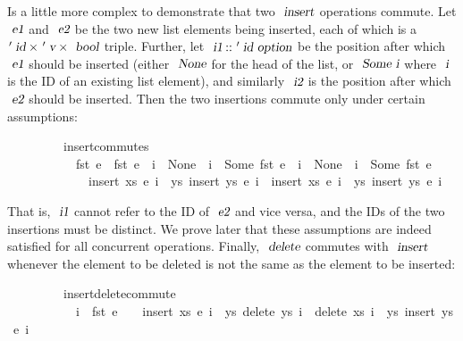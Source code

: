 Is a little more complex to demonstrate that two $\isa{insert}$ operations commute.
Let $\isa{e1}$ and $\isa{e2}$ be the two new list elements being inserted, each of which is a $\isacharprime\isa{id} \mathbin{\isasymtimes} \isacharprime\isa{v} \mathbin{\isasymtimes} \isa{bool}$ triple.
Further, let $\isa{i1} \mathbin{\isacharcolon\isacharcolon} \isacharprime\isa{id option}$ be the position after which $\isa{e1}$ should be inserted (either $\isa{None}$ for the head of the list, or $\isa{Some i}$ where $\isa{i}$ is the ID of an existing list element), and similarly $\isa{i2}$ is the position after which $\isa{e2}$ should be inserted.
Then the two insertions commute only under certain assumptions:
\vspace{0.35em}
\begin{isabellebody}
\ \ \ \ \ \ \ \ \ insert{\isacharunderscore}commutes{\isacharcolon}\isanewline
\ \ \ \ \ \ \ \ \ \ \ {\isachardoublequoteopen}fst\ e{}\ {\isasymnoteq}\ fst\ e{}{\isachardoublequoteclose}\ \ {\isachardoublequoteopen}i{}\ {\isacharequal}\ None\ {\isasymor}\ i{}\ {\isasymnoteq}\ Some\ {\isacharparenleft}fst\ e{}{\isacharparenright}{\isachardoublequoteclose}\ \ {\isachardoublequoteopen}i{}\ {\isacharequal}\ None\ {\isasymor}\ i{}\ {\isasymnoteq}\ Some\ {\isacharparenleft}fst\ e{}{\isacharparenright}{\isachardoublequoteclose}\isanewline
\ \ \ \ \ \ \ \ \ \ \ \ \ {\isachardoublequoteopen}insert\ xs\ e{}\ i{}\ {\isasymbind}\ {\isacharparenleft}{\isasymlambda}ys{\isachardot}\ insert\ ys\ e{}\ i{}{\isacharparenright}\ {\isacharequal}\ insert\ xs\ e{}\ i{}\ {\isasymbind}\ {\isacharparenleft}{\isasymlambda}ys{\isachardot}\ insert\ ys\ e{}\ i{}{\isacharparenright}{\isachardoublequoteclose}
\end{isabellebody}
\vspace{0.35em}
\noindent
That is, $\isa{i1}$ cannot refer to the ID of $\isa{e2}$ and vice versa, and the IDs of the two insertions must be distinct.
We prove later that these assumptions are indeed satisfied for all concurrent operations.
Finally, $\isa{delete}$ commutes with $\isa{insert}$ whenever the element to be deleted is not the same as the element to be inserted:
\vspace{0.35em}
\begin{isabellebody}
\ \ \ \ \ \ \ \ \ insert{\isacharunderscore}delete{\isacharunderscore}commute{\isacharcolon}\isanewline
\ \ \ \ \ \ \ \ \ \ \ {\isachardoublequoteopen}i{}\ {\isasymnoteq}\ fst\ e{\isachardoublequoteclose}\ \ \ \ {\isachardoublequoteopen}insert\ xs\ e\ i{}\ {\isasymbind}\ {\isacharparenleft}{\isasymlambda}ys{\isachardot}\ delete\ ys\ i{}{\isacharparenright}\ {\isacharequal}\ delete\ xs\ i{}\ {\isasymbind}\ {\isacharparenleft}{\isasymlambda}ys{\isachardot}\ insert\ ys\ e\ i{}{\isacharparenright}{\isachardoublequoteclose}
\end{isabellebody}

